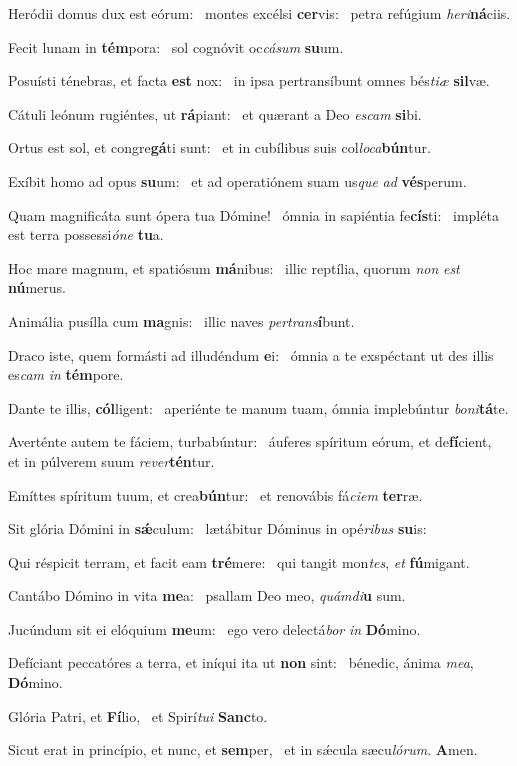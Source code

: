 \item Heródii domus dux est eórum:~\pscross{} montes excélsi \textbf{cer}vis:~\psstar{} petra refúgium \textit{heri}\textbf{ná}ciis.
\item Fecit lunam in \textbf{tém}pora:~\psstar{} sol cognóvit oc\textit{cásum} \textbf{su}um.
\item Posuísti ténebras, et facta \textbf{est} nox:~\psstar{} in ipsa pertransíbunt omnes bés\textit{tiæ} \textbf{sil}væ.
\item Cátuli leónum rugiéntes, ut \textbf{rá}piant:~\psstar{} et quærant a Deo \textit{escam} \textbf{si}bi.
\item Ortus est sol, et congre\textbf{gá}ti sunt:~\psstar{} et in cubílibus suis col\textit{loca}\textbf{bún}tur.
\item Exíbit homo ad opus \textbf{su}um:~\psstar{} et ad operatiónem suam us\textit{que} \textit{ad} \textbf{vés}perum.
\item Quam magnificáta sunt ópera tua Dómine!~\pscross{} ómnia in sapiéntia fe\textbf{cís}ti:~\psstar{} impléta est terra possessi\textit{óne} \textbf{tu}a.
\item Hoc mare magnum, et spatiósum \textbf{má}nibus:~\psstar{} illic reptília, quorum \textit{non} \textit{est} \textbf{nú}merus.
\item Animália pusílla cum \textbf{ma}gnis:~\psstar{} illic naves \textit{pertrans}\textbf{í}bunt.
\item Draco iste, quem formásti ad illudéndum \textbf{e}i:~\psstar{} ómnia a te exspéctant ut des illis es\textit{cam} \textit{in} \textbf{tém}pore.
\item Dante te illis, \textbf{cól}ligent:~\psstar{} aperiénte te manum tuam, ómnia implebúntur \textit{boni}\textbf{tá}te.
\item Averténte autem te fáciem, turbabúntur:~\pscross{} áuferes spíritum eórum, et de\textbf{fí}cient,~\psstar{} et in púlverem suum \textit{rever}\textbf{tén}tur.
\item Emíttes spíritum tuum, et crea\textbf{bún}tur:~\psstar{} et renovábis fá\textit{ciem} \textbf{ter}ræ.
\item Sit glória Dómini in \textbf{sǽ}culum:~\psstar{} lætábitur Dóminus in opé\textit{ribus} \textbf{su}is:
\item Qui réspicit terram, et facit eam \textbf{tré}mere:~\psstar{} qui tangit mon\textit{tes}, \textit{et} \textbf{fú}migant.
\item Cantábo Dómino in vita \textbf{me}a:~\psstar{} psallam Deo meo, \textit{quámdi}\textbf{u} sum.
\item Jucúndum sit ei elóquium \textbf{me}um:~\psstar{} ego vero delectá\textit{bor} \textit{in} \textbf{Dó}mino.
\item Defíciant peccatóres a terra, et iníqui ita ut \textbf{non} sint:~\psstar{} bénedic, ánima \textit{mea}, \textbf{Dó}mino.
\item Glória Patri, et \textbf{Fí}lio,~\psstar{} et Spirí\textit{tui} \textbf{Sanc}to.
\item Sicut erat in princípio, et nunc, et \textbf{sem}per,~\psstar{} et in sǽcula sæcu\textit{lórum}. \textbf{A}men.
